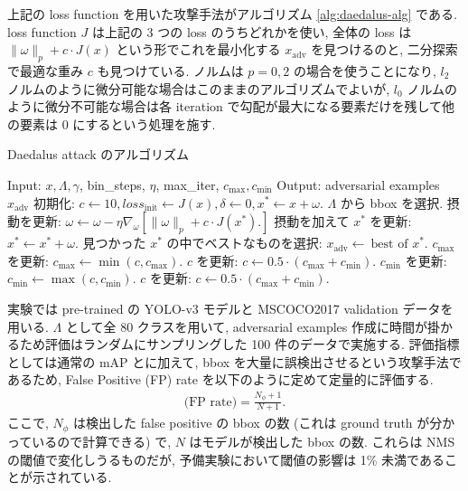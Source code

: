 上記の loss function を用いた攻撃手法がアルゴリズム \ref{alg:daedalus-alg} である.
loss function $J$ は上記の 3 つの loss のうちどれかを使い, 全体の loss は $\| \omega \|_p + c \cdot J(x)$ という形でこれを最小化する $x_{\text{adv}}$ を見つけるのと, 二分探索で最適な重み $c$ も見つけている.
ノルムは $p = 0, 2$ の場合を使うことになり, $l_2$ ノルムのように微分可能な場合はこのままのアルゴリズムでよいが, $l_0$ ノルムのように微分不可能な場合は各 iteration で勾配が最大になる要素だけを残して他の要素は 0 にするという処理を施す.
%
\begin{algorithm}
\caption{Daedalus attack のアルゴリズム}
\label{alg:daedalus-alg}
\begin{algorithmic}[1]
    \State Input: $x, \Lambda, \gamma$, bin\_steps, $\eta$, max\_iter, $c_{\text{max}}, c_{\text{min}}$
    \State Output: adversarial examples $x_{\text{adv}}$
	\State 初期化: $c \leftarrow 10, loss_{\text{init}} \leftarrow J(x), \delta \leftarrow 0, x^* \leftarrow x + \omega$.
	\State $\Lambda$ から bbox を選択.
	\State 摂動を更新: $\omega \leftarrow \omega - \eta \nabla_{\omega} \left[ \| \omega \|_p + c \cdot J(x^*). \right]$
	\State 摂動を加えて $x^*$ を更新: $x^* \leftarrow x^* + \omega$.
	\EndFor
	\State 見つかった $x^*$ の中でベストなものを選択: $x_{\text{adv}} \leftarrow \ \text{best of } x^*$.
	\State $c_{\text{max}}$ を更新: $c_{\text{max}} \leftarrow \min (c, c_{\text{max}})$.
	\State $c$ を更新: $c \leftarrow 0.5 \cdot (c_{\text{max}} + c_{\text{min}})$.
	\Else
	\State $c_{\text{min}}$ を更新: $c_{\text{min}} \leftarrow \max (c, c_{\text{min}})$.
	\State $c$ を更新: $c \leftarrow 0.5 \cdot (c_{\text{max}} + c_{\text{min}})$.
	\EndIf
	\EndFor
\end{algorithmic} 
\end{algorithm}

実験では pre-trained の YOLO-v3 \cite{redmon2018yolov3} モデルと MSCOCO2017 validation データを用いる.
$\Lambda$ として全 80 クラスを用いて, adversarial examples 作成に時間が掛かるため評価はランダムにサンプリングした 100 件のデータで実施する.
評価指標としては通常の mAP とに加えて, bbox を大量に誤検出させるという攻撃手法であるため, False Positive (FP) rate を以下のように定めて定量的に評価する.
%
\begin{eqnarray}
\text{(FP rate)} = \frac{N_\phi + 1}{N + 1}.
\label{eq:daedalus-fp}
\end{eqnarray}
%
ここで, $N_\phi$ は検出した false positive の bbox の数 (これは ground truth が分かっているので計算できる) で, $N$ はモデルが検出した bbox の数.
これらは NMS の閾値で変化しうるものだが, 予備実験において閾値の影響は 1\% 未満であることが示されている.

